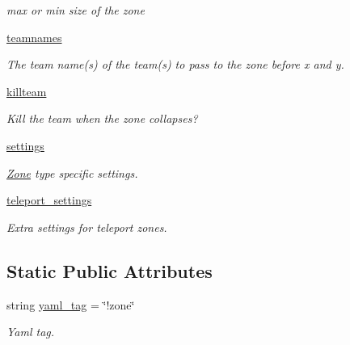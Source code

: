 \begin{DoxyCompactItemize}
\begin{DoxyCompactList}\small\item\em max or min size of the zone \item\end{DoxyCompactList}\item 
\hyperlink{class_zone_1_1_zone_a0f3f8429ae8a37672f700da3f2805a91}{teamnames}
\begin{DoxyCompactList}\small\item\em The team name(s) of the team(s) to pass to the zone before x and y. \item\end{DoxyCompactList}\item 
\hyperlink{class_zone_1_1_zone_a45db96faa826bf1e485c70da9c07d83e}{killteam}
\begin{DoxyCompactList}\small\item\em Kill the team when the zone collapses? \item\end{DoxyCompactList}\item 
\hyperlink{class_zone_1_1_zone_a57b65c53ff747cf9504c88ff37d7b9ee}{settings}
\begin{DoxyCompactList}\small\item\em \hyperlink{class_zone_1_1_zone}{Zone} type specific settings. \item\end{DoxyCompactList}\item 
\hyperlink{class_zone_1_1_zone_a2b9ae272876347626e25ead4d48f9a97}{teleport\_\-settings}
\begin{DoxyCompactList}\small\item\em Extra settings for teleport zones. \item\end{DoxyCompactList}\end{DoxyCompactItemize}
\subsection*{Static Public Attributes}
\begin{DoxyCompactItemize}
\item 
string \hyperlink{class_zone_1_1_zone_aceea2ada107fbe1e78976e88a9bc74df}{yaml\_\-tag} = \char`\"{}!zone\char`\"{}
\begin{DoxyCompactList}\small\item\em Yaml tag. \item\end{DoxyCompactList}\end{DoxyCompactItemize}
